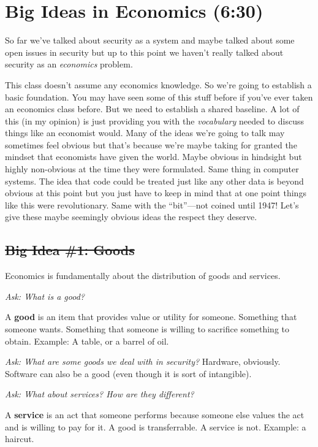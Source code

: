 \documentclass[11pt]{article}
\begin{document}
\section{Big Ideas in Economics (6:30)}

So far we've talked about security as a system and maybe talked about some open issues in security but up to this point we haven't really talked about security as an {\it economics} problem.

This class doesn't assume any economics knowledge. So we're going to establish a basic foundation.
You may have seen some of this stuff before if you've ever taken an economics class before.
But we need to establish a shared baseline. A lot of this (in my opinion) is just providing you with the {\it vocabulary} needed to discuss things like an economist would. Many of the ideas we're going to talk may sometimes feel obvious but that's because we're maybe taking for granted the mindset that economists have given the world. Maybe obvious in hindsight but highly non-obvious at the time they were formulated. Same thing in computer systems. The idea that code could be treated just like any other data is beyond obvious at this point but you just have to keep in mind that at one point things like this were revolutionary. Same with the ``bit''---not coined until 1947! Let's give these maybe seemingly obvious ideas the respect they deserve.


\subsection{\sout{Big Idea \#1: Goods}}

Economics is fundamentally about the distribution of goods and services. 

{\it Ask: What is a good?}

A {\bf good} is an item that provides value or utility for someone. Something that someone wants. Something that someone is willing to sacrifice something to obtain. Example: A table, or a barrel of oil.

{\it Ask: What are some goods we deal with in security?} Hardware, obviously. Software can also be a good (even though it is sort of intangible).

{\it Ask: What about services? How are they different?}

A {\bf service} is an act that someone performs because someone else values the act and is willing to pay for it. 
A good is transferrable. A service is not. 
Example: a haircut.
\end{document}
